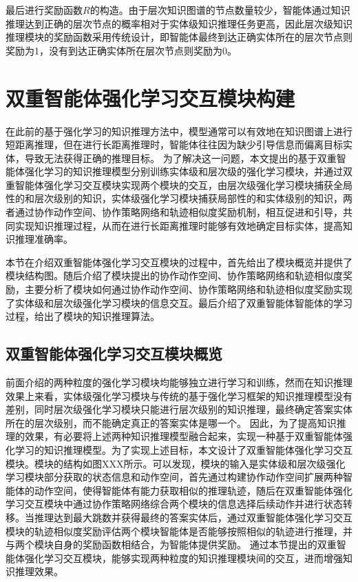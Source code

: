 \documentclass[algorithmlist, AutoFakeBold, AutoFakeSlant, figurelist, tablelist, nomlist, masters]{seuthesix}
\begin{document}
最后进行奖励函数$R$的构造。由于层次知识图谱的节点数量较少，智能体通过知识推理达到正确的层次节点的概率相对于实体级知识推理任务更高，因此层次级知识推理模块的奖励函数采用传统设计，即智能体最终到达正确实体所在的层次节点则奖励为1，没有到达正确实体所在层次节点则奖励为0。

\section{双重智能体强化学习交互模块构建}
在此前的基于强化学习的知识推理方法中，模型通常可以有效地在知识图谱上进行短距离推理，但在进行长距离推理时，智能体往往因为缺少引导信息而偏离目标实体，导致无法获得正确的推理目标。
为了解决这一问题，本文提出的基于双重智能体强化学习的知识推理模型分别训练实体级和层次级的强化学习模块，并通过双重智能体强化学习交互模块实现两个模块的交互，由层次级强化学习模块捕获全局性的和层次级别的知识，实体级强化学习模块捕获局部性的和实体级别的知识，两者通过协作动作空间、协作策略网络和轨迹相似度奖励机制，相互促进和引导，共同实现知识推理过程，从而在进行长距离推理时能够有效地确定目标实体，提高知识推理准确率。

本节在介绍双重智能体强化学习交互模块的过程中，首先给出了模块概览并提供了模块结构图。随后介绍了模块提出的协作动作空间、协作策略网络和轨迹相似度奖励，主要分析了模块如何通过协作动作空间、协作策略网络和轨迹相似度奖励实现了实体级和层次级强化学习模块的信息交互。最后介绍了双重智能体智能体的学习过程，给出了模块的知识推理算法。


\subsection{双重智能体强化学习交互模块概览}
前面介绍的两种粒度的强化学习模块均能够独立进行学习和训练，然而在知识推理效果上来看，实体级强化学习模块与传统的基于强化学习框架的知识推理模型没有差别，同时层次级强化学习模块只能进行层次级别的知识推理，最终确定答案实体所在的层次级别，而不能确定真正的答案实体是哪一个。
因此，为了提高知识推理的效果，有必要将上述两种知识推理模型融合起来，实现一种基于双重智能体强化学习的知识推理模型。为了实现上述目标，本文设计了双重智能体强化学习交互模块。模块的结构如图XXX所示。可以发现，模块的输入是实体级和层次级强化学习模块部分获取的状态信息和动作空间，首先通过构建协作动作空间扩展两种智能体的动作空间，使得智能体有能力获取相似的推理轨迹，随后在双重智能体强化学习交互模块中通过协作策略网络综合两个模块的信息选择后续动作并进行状态转移。当推理达到最大跳数并获得最终的答案实体后，通过双重智能体强化学习交互模块的轨迹相似度奖励评估两个模块智能体是否能够按照相似的轨迹进行推理，并与两个模块自身的奖励函数相结合，为智能体提供奖励。
通过本节提出的双重智能体强化学习交互模块，能够实现两种粒度的知识推理模块间的交互，进而增强知识推理效果。
\end{document}

